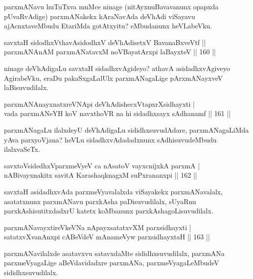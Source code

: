 \begin{artha}
parxmANavu huTuTxva muMce ninage (nitAyxnuBavavanunx opapxda pUvaRvAdige) parxmANakekx kAraNavAda deVhAdi viSayavu ajAcnxtaveMbudu EtariMda gotAtxyitu? eMbudanunx heVLabeVku.
\end{artha}

\begin{shl}
savxtaH sidodhxV\s thavA\s sidodhxV deVhAdisetxV BavanaBxveVtf ||  \\
parxmANAnAM parxmANatavxM noVBayatArxpi laBayxteV \hfill||  160 ||  
\end{shl}

\begin{artha}
ninage deVhAdigaLu savxtaH sidadhxvAgideyo? athavA asidadhxvAgiveyo AgirabeVku, eraDu pakaSxgaLalUlx parxmANagaLige pArxmANayxveV laBisuvudilalx.
\end{artha}

\begin{shl}
parxmANAnayxnatxreVNApi deVhAdishecxVtapxrXsidhayxti | \\
vada parxmANeYH koV navxthoVR na hi sidadhxsayx sAdhanamf \hfill||  161 ||  
\end{shl}

\begin{artha}
parxmANagaLu ilalxdeyU deVhAdigaLu sididhxsuvudAdare, parxmANagaLiMda yAva parxyoVjana? heVLu sidadhxvAdadadxnunx sAdhisuvudeMbudu ilalxvaSeTx.
\end{artha}

\begin{shl}
savxtoV\s sidedhxV\s parxmeVyeV ca nAsatoV vayxcnijxkA parxmA | \\
nABivayxnakitx savitA KarashaqknagxM suPxrananxpi \hfill||  162 ||  
\end{shl}

\begin{artha}
savxtaH asidadhxvAda parxmeVyavalalxda viSayakekx parxmANavalalx, asatatxnunx parxmANavu parxkAsha paDisuvudilalx, sUyaRnu parxkAshisutitxdadxrU katetx koMbanunx parxkAshagoLisuvudilalx.
\end{artha}

\begin{shl}
parxmANavayxtireVkeVNa nApayxsatatxvXM parxsidhayxti | \\
satatxvXvanAnxpi cABeVdeV mAnameVyw parxsidhayxtaH \hfill||  163 ||  
\end{shl}

\begin{artha}
parxmANavilalxde asatavxvu satavxdaMte sididhxsuvudilalx, parxmANa parxmeVyagaLige aBeVdavidadxre parxmANa, parxmeVyagaLeMbudeV sididhxsuvudilalx.
\end{artha}

